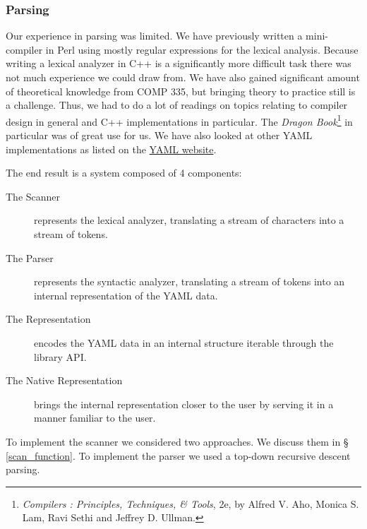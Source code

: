 \documentclass{article}
\begin{document}
\subsubsection{Parsing}
Our experience in parsing was limited.  We have previously written a 
mini-compiler in Perl using mostly regular expressions for the lexical 
analysis.  Because writing a lexical analyzer in C++ is a significantly more 
difficult task there was not much experience we could draw from.  We have also 
gained significant amount of theoretical knowledge from COMP 335, but bringing 
theory to practice still is a challenge.  Thus, we had to do a lot of readings 
on topics relating to compiler design in general and C++ implementations in 
particular.  The \emph{Dragon Book}\footnote{\emph{Compilers :  Principles, 
Techniques, \& Tools}, 2e, by Alfred V. Aho, Monica S. Lam, Ravi Sethi and 
Jeffrey D. Ullman.} in particular was of great use for us.  We have also looked 
at other YAML implementations as listed on the \href{http://yaml.org/}{YAML 
website}.

The end result is a system composed of 4 components:

\begin{description}
  \item[The Scanner] represents the lexical analyzer, translating a stream of 
    characters into a stream of tokens.
  \item[The Parser] represents the syntactic analyzer, translating a stream of 
    tokens into an internal representation of the YAML data.
  \item[The Representation] encodes the YAML data in an internal structure 
    iterable through the library API.
  \item[The Native Representation] brings the internal representation closer to 
    the user by serving it in a manner familiar to the user.
\end{description}

To implement the scanner we considered two approaches.  We discuss them in 
\S{} \ref{scan_function}.  To implement the parser we used a top-down recursive 
descent parsing.
\end{document}
